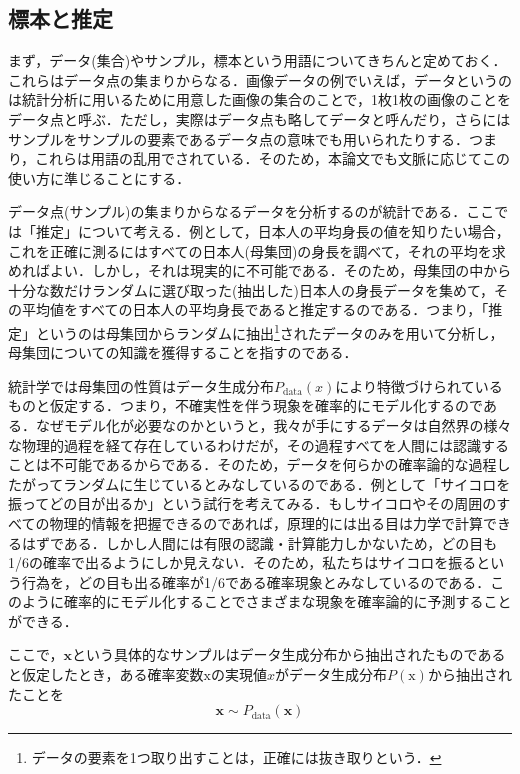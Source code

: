 \documentclass[a4paper,11pt]{jsreport}
\begin{document}
\subsection{標本と推定}
まず，データ(集合)やサンプル，標本という用語についてきちんと定めておく．これらはデータ点の集まりからなる．画像データの例でいえば，データというのは統計分析に用いるために用意した画像の集合のことで，1枚1枚の画像のことをデータ点と呼ぶ．ただし，実際はデータ点も略してデータと呼んだり，さらにはサンプルをサンプルの要素であるデータ点の意味でも用いられたりする．つまり，これらは用語の乱用でされている．そのため，本論文でも文脈に応じてこの使い方に準じることにする．\par
データ点(サンプル)の集まりからなるデータを分析するのが統計である．ここでは「推定」について考える．例として，日本人の平均身長の値を知りたい場合，これを正確に測るにはすべての日本人(母集団)の身長を調べて，それの平均を求めればよい．しかし，それは現実的に不可能である．そのため，母集団の中から十分な数だけランダムに選び取った(抽出した)日本人の身長データを集めて，その平均値をすべての日本人の平均身長であると推定するのである．つまり，「推定」というのは母集団からランダムに抽出\footnote{データの要素を1つ取り出すことは，正確には抜き取りという．}されたデータのみを用いて分析し，母集団についての知識を獲得することを指すのである．\par
統計学では母集団の性質はデータ生成分布$P_{\text{data}}({x})$により特徴づけられているものと仮定する．つまり，不確実性を伴う現象を確率的にモデル化するのである．なぜモデル化が必要なのかというと，我々が手にするデータは自然界の様々な物理的過程を経て存在しているわけだが，その過程すべてを人間には認識することは不可能であるからである．そのため，データを何らかの確率論的な過程したがってランダムに生じているとみなしているのである．例として「サイコロを振ってどの目が出るか」という試行を考えてみる．もしサイコロやその周囲のすべての物理的情報を把握できるのであれば，原理的には出る目は力学で計算できるはずである．しかし人間には有限の認識・計算能力しかないため，どの目も1/6の確率で出るようにしか見えない．そのため，私たちはサイコロを振るという行為を，どの目も出る確率が1/6である確率現象とみなしているのである．このように確率的にモデル化することでさまざまな現象を確率論的に予測することができる．\par
ここで，$\bm{x}$という具体的なサンプルはデータ生成分布から抽出されたものであると仮定したとき，ある確率変数$\mathrm{x}$の実現値$x$がデータ生成分布$P(\mathrm{x})$から抽出されたことを
\begin{equation}
  \bm{x} \sim P_{\text{data}}(\mathbf{x})
\end{equation}
\end{document}
